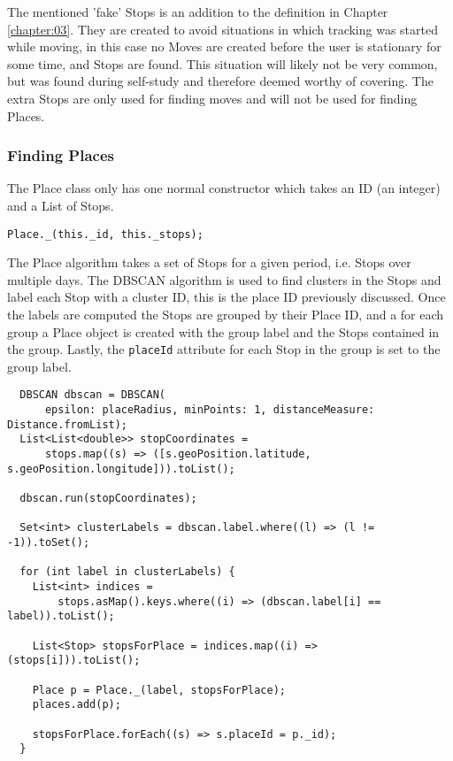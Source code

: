 The mentioned 'fake' Stops is an addition to the definition in Chapter \ref{chapter:03}. They are created to avoid situations in which tracking was started while moving, in this case no Moves are created before the user is stationary for some time, and Stops are found. This situation will likely not be very common, but was found during self-study and therefore deemed worthy of covering. The extra Stops are only used for finding moves and will not be used for finding Places.

\subsubsection{Finding Places}
The Place class only has one normal constructor which takes an ID (an integer) and a List of Stops. 
\begin{verbatim}
Place._(this._id, this._stops);
\end{verbatim}

The Place algorithm takes a set of Stops for a given period, i.e. Stops over multiple days. The DBSCAN algorithm \cite{density-based-1996} is used to find clusters in the Stops and label each Stop with a cluster ID, this is the place ID previously discussed. Once the labels are computed the Stops are grouped by their Place ID, and a for each group a Place object is created with the group label and the Stops contained in the group. Lastly, the \verb|placeId| attribute for each Stop in the group is set to the group label.

\begin{verbatim}
  DBSCAN dbscan = DBSCAN(
      epsilon: placeRadius, minPoints: 1, distanceMeasure: Distance.fromList);
  List<List<double>> stopCoordinates =
      stops.map((s) => ([s.geoPosition.latitude, s.geoPosition.longitude])).toList();

  dbscan.run(stopCoordinates);

  Set<int> clusterLabels = dbscan.label.where((l) => (l != -1)).toSet();

  for (int label in clusterLabels) {
    List<int> indices =
        stops.asMap().keys.where((i) => (dbscan.label[i] == label)).toList();

    List<Stop> stopsForPlace = indices.map((i) => (stops[i])).toList();

    Place p = Place._(label, stopsForPlace);
    places.add(p);

    stopsForPlace.forEach((s) => s.placeId = p._id);
  }
\end{verbatim}

